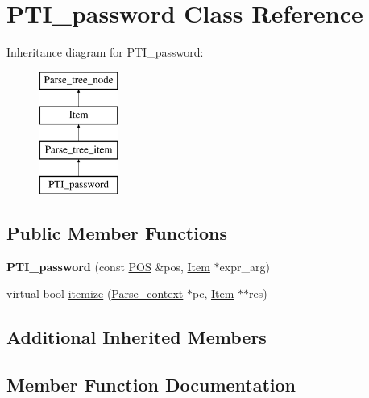 \hypertarget{classPTI__password}{}\section{P\+T\+I\+\_\+password Class Reference}
\label{classPTI__password}
Inheritance diagram for P\+T\+I\+\_\+password\+:\begin{figure}[H]
\begin{center}
\leavevmode
\includegraphics[height=4.000000cm]{classPTI__password}
\end{center}
\end{figure}
\subsection*{Public Member Functions}
\begin{DoxyCompactItemize}
\item 
\mbox{\label{classPTI__password_aadfcd887d1b92754bb7884a03cf96997}} 
{\bfseries P\+T\+I\+\_\+password} (const \mbox{\hyperlink{structYYLTYPE}{P\+OS}} \&pos, \mbox{\hyperlink{classItem}{Item}} $\ast$expr\+\_\+arg)
\item 
virtual bool \mbox{\hyperlink{classPTI__password_a3970b1d42198fa667f54cebdd024eac9}{itemize}} (\mbox{\hyperlink{structParse__context}{Parse\+\_\+context}} $\ast$pc, \mbox{\hyperlink{classItem}{Item}} $\ast$$\ast$res)
\end{DoxyCompactItemize}
\subsection*{Additional Inherited Members}


\subsection{Member Function Documentation}
\mbox{\label{classPTI__password_a3970b1d42198fa667f54cebdd024eac9}} 
